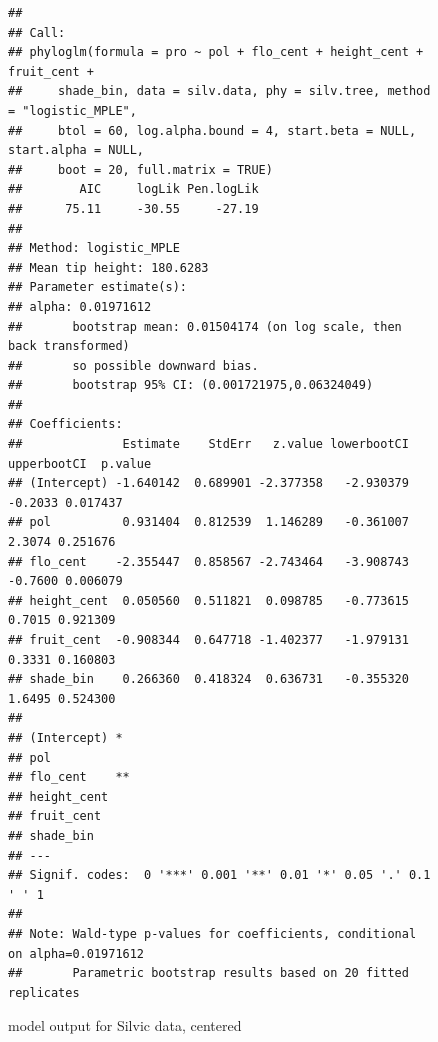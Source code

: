 \documentclass{article}\usepackage[]{graphicx}\usepackage[]{color}
\makeatletter
\newenvironment{kframe}{%
 \def\at@end@of@kframe{}%
 \ifinner\ifhmode%
  \def\at@end@of@kframe{\end{minipage}}%
  \begin{minipage}{\columnwidth}%
 \fi\fi%
 \def\FrameCommand##1{\hskip\@totalleftmargin \hskip-\fboxsep
 \colorbox{shadecolor}{##1}\hskip-\fboxsep
     \hskip-\linewidth \hskip-\@totalleftmargin \hskip\columnwidth}%
 \MakeFramed {\advance\hsize-\width
   \@totalleftmargin\z@ \linewidth\hsize
   \@setminipage}}%
 {\par\unskip\endMakeFramed%
 \at@end@of@kframe}
\newenvironment{knitrout}{}{} %
\makeatother
\begin{document}
\begin{figure}[h!]
\begin{knitrout}
\color{fgcolor}\begin{kframe}
\begin{verbatim}
## 
## Call:
## phyloglm(formula = pro ~ pol + flo_cent + height_cent + fruit_cent + 
##     shade_bin, data = silv.data, phy = silv.tree, method = "logistic_MPLE", 
##     btol = 60, log.alpha.bound = 4, start.beta = NULL, start.alpha = NULL, 
##     boot = 20, full.matrix = TRUE)
##        AIC     logLik Pen.logLik 
##      75.11     -30.55     -27.19 
## 
## Method: logistic_MPLE
## Mean tip height: 180.6283
## Parameter estimate(s):
## alpha: 0.01971612 
##       bootstrap mean: 0.01504174 (on log scale, then back transformed)
##       so possible downward bias.
##       bootstrap 95% CI: (0.001721975,0.06324049)
## 
## Coefficients:
##              Estimate    StdErr   z.value lowerbootCI upperbootCI  p.value
## (Intercept) -1.640142  0.689901 -2.377358   -2.930379     -0.2033 0.017437
## pol          0.931404  0.812539  1.146289   -0.361007      2.3074 0.251676
## flo_cent    -2.355447  0.858567 -2.743464   -3.908743     -0.7600 0.006079
## height_cent  0.050560  0.511821  0.098785   -0.773615      0.7015 0.921309
## fruit_cent  -0.908344  0.647718 -1.402377   -1.979131      0.3331 0.160803
## shade_bin    0.266360  0.418324  0.636731   -0.355320      1.6495 0.524300
##               
## (Intercept) * 
## pol           
## flo_cent    **
## height_cent   
## fruit_cent    
## shade_bin     
## ---
## Signif. codes:  0 '***' 0.001 '**' 0.01 '*' 0.05 '.' 0.1 ' ' 1
## 
## Note: Wald-type p-values for coefficients, conditional on alpha=0.01971612
##       Parametric bootstrap results based on 20 fitted replicates
\end{verbatim}
\end{kframe}
\end{knitrout}
\caption{model output for Silvic data, centered}
\end{figure}
\end{document}
